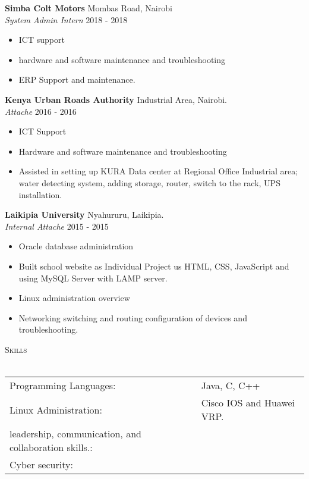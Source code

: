 \documentclass[a4paper]{article}
\newcommand{\lineunder} {
    \vspace*{-8pt} \\
    \hspace*{-18pt} \hrulefill \\
}
\newcommand{\header} [1] {
    {\hspace*{-18pt}\vspace*{6pt} \textsc{#1}}
    \vspace*{-6pt} \lineunder
}
\begin{document}
\textbf{Simba Colt Motors} \hfill Mombas Road, Nairobi\\
\textit{System Admin Intern} \hfill 2018 - 2018\\
\vspace{-1mm}
\begin{itemize} \itemsep 1pt
	\item ICT support
	\item hardware and software maintenance and troubleshooting
	\item ERP Support and maintenance.
\end{itemize}
\textbf{Kenya Urban Roads Authority} \hfill Industrial Area, Nairobi.\\
\textit{Attache} \hfill 2016 - 2016\\
\vspace{-1mm}
\begin{itemize} \itemsep 1pt
	\item ICT Support
	\item Hardware and software maintenance and troubleshooting
	\item Assisted in setting up KURA Data center at Regional Office Industrial area; water detecting system, adding storage, router, switch to the rack, UPS installation.
\end{itemize}
\textbf{Laikipia University} \hfill Nyahururu, Laikipia.\\
\textit{Internal Attache} \hfill 2015 - 2015\\
\vspace{-1mm}
\begin{itemize} \itemsep 1pt
	\item Oracle database administration
	\item Built school website as Individual Project us HTML, CSS, JavaScript and using MySQL Server with LAMP server.
	\item Linux administration overview
	\item Networking switching and routing configuration of devices and troubleshooting.
\end{itemize}

\header{Skills}
\begin{tabular}{ l l }
	Programming Languages:                                & Java, C, C++              \\
	Linux Administration:                                 & Cisco IOS and Huawei VRP. \\
	leadership, communication, and collaboration skills.: &                           \\
	Cyber security:                                       &                           \\
\end{tabular}
\vspace{2mm}
\end{document}

